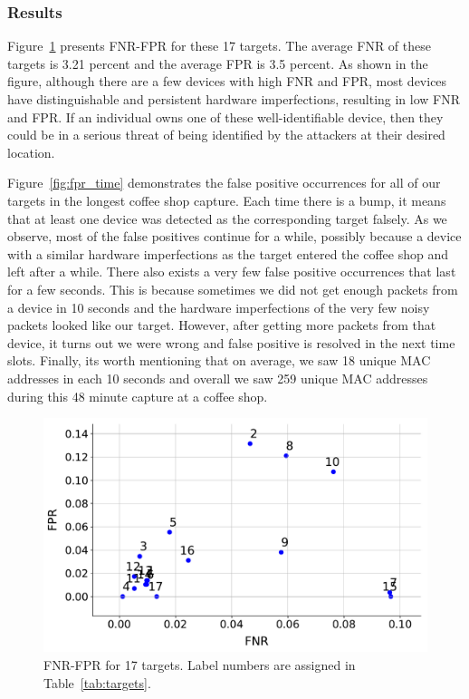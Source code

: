 \subsubsection*{Results}
Figure~\ref{fig:fpr_fnr} presents FNR-FPR for these 17 targets. The average FNR of these targets is 3.21 percent and the average FPR is 3.5 percent. As shown in the figure, although there are a few devices with high FNR and FPR, most devices have distinguishable and persistent hardware imperfections, resulting in low FNR and FPR. If an individual owns one of these well-identifiable device, then they could be in a serious threat of being identified by the attackers at their desired location. 

Figure~\ref{fig:fpr_time} demonstrates the false positive occurrences for all of our targets in the longest coffee shop capture. Each time there is a bump, it means that at least one device was detected as the corresponding target falsely. As we observe, most of the false positives continue for a while, possibly because a device with a similar hardware imperfections as the target entered the coffee shop and left after a while. 
There also exists a very few false positive occurrences that last for a few seconds. This is because sometimes we did not get enough packets from a device in 10 seconds and the hardware imperfections of the very few noisy packets looked like our target. However, after getting more packets from that device, it turns out we were wrong and false positive is resolved in the next time slots. Finally, its worth mentioning that on average, we saw 18 unique MAC addresses in each 10 seconds and overall we saw 259 unique MAC addresses during this 48 minute capture at a coffee shop.

\begin{figure}[t!]
    \centering
    \includegraphics[width = \linewidth]{plots/fpr_fnr_10sec.pdf} 
    \caption{FNR-FPR for 17 targets. Label numbers are assigned in Table~\ref{tab:targets}.}
    \label{fig:fpr_fnr}
\end{figure}

